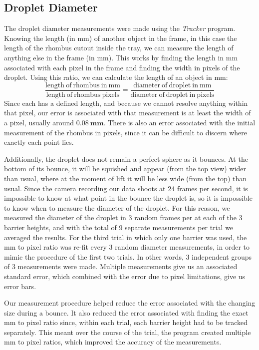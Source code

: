     \subsection{Droplet Diameter}
    The droplet diameter measurements were made using the \textit{Tracker} program. Knowing the length (in mm) of another object in the frame, in this case the length of the rhombus cutout inside the tray, we can measure the length of anything else in the frame (in mm). This works by finding the length in mm associated with each pixel in the frame and finding the width in pixels of the droplet. Using this ratio, we can calculate the length of an object in mm:   
$$ 
\frac{\mathrm{length~of~rhombus~in~mm}}{\mathrm{length~of~rhombus~pixels}}= \frac{\mathrm{diameter~of~droplet~in~mm}}{\mathrm{diameter~of~droplet~in~pixels}} 
$$ 
Since each has a defined length, and because we cannot resolve anything within that pixel, our error is associated with that measurement is at least the width of a pixel, usually around $\mathbf{0.08~\mathrm{\textbf{mm}}}$. There is also an error associated with the initial measurement of the rhombus in pixels, since it can be difficult to discern where exactly each point lies.

Additionally, the droplet does not remain a perfect sphere as it bounces. At the bottom of its bounce, it will be squished and appear (from the top view) wider than usual, where at the moment of lift it will be less wide (from the top) than usual. Since the camera recording our data shoots at 24 frames per second, it is impossible to know at what point in the bounce the droplet is, so it is impossible to know when to measure the diameter of the droplet. For this reason, we measured the diameter of the droplet in 3 random frames per at each of the 3 barrier heights, and with the total of 9 separate measurements per trial we averaged the results. For the third trial in which only one barrier was used, the mm to pixel ratio was re-fit every 3 random diameter measurements, in order to mimic the procedure of the first two trials. In other words, 3 independent groups of 3 measurements were made. Multiple measurements give us an associated standard error, which combined with the error due to pixel limitations, give us error bars. 

Our measurement procedure helped reduce the error associated with the changing size during a bounce. It also reduced the error associated with finding the exact mm to pixel ratio since, within each trial, each barrier height had to be tracked separately. This meant over the course of the trial, the program created multiple mm to pixel ratios, which improved the accuracy of the measurements.

